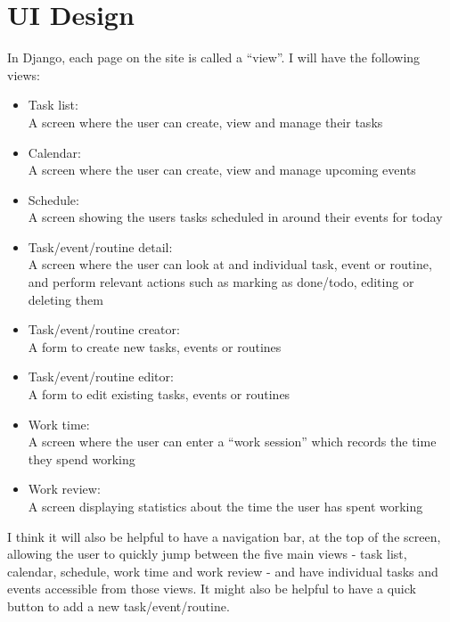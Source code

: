 \documentclass{article}
\begin{document}
\section{UI Design}
In Django,
each page on the site is called a ``view''.
I will have the following views:
\begin{itemize}
	\item Task list:\\
	      A screen where the user can create, view and manage their tasks
	\item Calendar:\\
	      A screen where the user can create, view and manage upcoming events
	\item Schedule:\\
	      A screen showing the users tasks scheduled in around their events for today
	\item Task/event/routine detail:\\
	      A screen where the user can look at and individual task, event or routine,
	      and perform relevant actions such as marking as done/todo,
	      editing or deleting them
	\item Task/event/routine creator:\\
	      A form to create new tasks, events or routines
	\item Task/event/routine editor:\\
	      A form to edit existing tasks, events or routines
	\item Work time:\\
	      A screen where the user can enter a ``work session'' which records the time they spend working
	\item Work review:\\
	      A screen displaying statistics about the time the user has spent working
\end{itemize}

I think it will also be helpful to have a navigation bar,
at the top of the screen,
allowing the user to quickly jump between the five main views -
task list, calendar, schedule, work time and work review -
and have individual tasks and events accessible from those views.
It might also be helpful to have a quick button to add a new task/event/routine.
\end{document}
